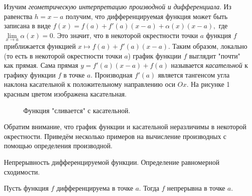 Изучим
\emph{геометрическую интерпретацию производной
    и дифференциала}.
Из равенства $h=x-a$ получим, что дифференцируемая
функция может быть записана в виде $f(x)=f(a)+
    f'(a)(x-a)+\alpha(x)(x-a),$ где $\lim\limits_{
        x\rightarrow a}\alpha(x)=0.$ Это значит, что в
некоторой окрестности точки $a$ функция $f$
приближается функцией $x\mapsto f(a)+f'(a)(x-a).$
Таким образом, локально (то есть в некоторой
окрестности точки $a$) график функции $f$
выглядит "почти" как прямая. Сама прямая
$y=f'(a)(x-a)+f(a)$ называется
\emph{касательной} к графику функции $f$ в точке
$a.$ Производная $f'(a)$
является тангенсом угла наклона касательной
к положительному направлению оси $Ox.$
На рисунке 1 красным цветом изображена
касательная. \begin{figure}[h!]
    \caption{Функция "сливается" с касательной.}
    \label{fig:image}
\end{figure} Обратим внимание, что
график функции и касательной неразличимы
в некоторой окрестности.
Приведём несколько примеров на вычисление
производных с помощью определения производной.

\newpage
\begin{problem}
Непрерывность дифференцируемой функции. Определение равномерной сходимости.
\end{problem}

\begin{proposition}
    Пусть функция $f$ дифференцируема
    в точке $a.$ Тогда $f$ непрерывна в точке $a.$
\end{proposition}

